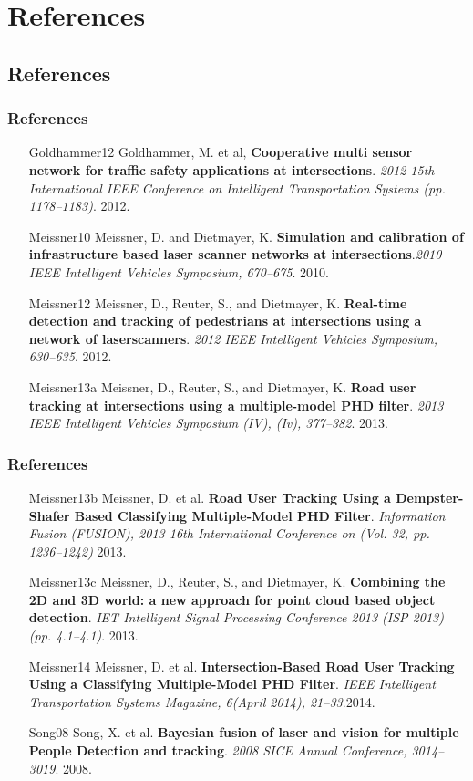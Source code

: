 \documentclass{beamer}
\begin{document}
\section{References}
\subsection{References}
\frame
{
	\frametitle{References}
	\footnotesize{	
	\begin{itemize}[leftmargin=.6in]
		\item [Goldhammer12] Goldhammer, M. et al, \textbf{Cooperative multi sensor network for traffic safety applications at intersections}. \textit{2012 15th International IEEE Conference on Intelligent Transportation Systems (pp. 1178–1183)}. 2012.
	    \item [Meissner10] Meissner, D. and Dietmayer, K. \textbf{Simulation and calibration of infrastructure based laser scanner networks at intersections}.\textit{2010 IEEE Intelligent Vehicles Symposium, 670–675}. 2010.
	    \item [Meissner12] Meissner, D., Reuter, S., and Dietmayer, K. \textbf{Real-time detection and tracking of pedestrians at intersections using a network of laserscanners}. \textit{2012 IEEE Intelligent Vehicles Symposium, 630–635}. 2012.
	    \item [Meissner13a] Meissner, D., Reuter, S., and Dietmayer, K. \textbf{Road user tracking at intersections using a multiple-model PHD filter}. \textit{2013 IEEE Intelligent Vehicles Symposium (IV), (Iv), 377–382}. 2013.
		
		
	\end{itemize}
	}
}

\frame
{
	\frametitle{References}
		\footnotesize{
	\begin{itemize}[leftmargin=.6in]
		\item [Meissner13b] Meissner, D. et al. \textbf{Road User Tracking Using a Dempster-Shafer Based Classifying Multiple-Model PHD Filter}. \textit{Information Fusion (FUSION), 2013 16th International Conference on (Vol. 32, pp. 1236–1242)} 2013.
		\item [Meissner13c] Meissner, D., Reuter, S., and Dietmayer, K. \textbf{Combining the 2D and 3D world: a new approach for point cloud based object detection}. \textit{IET Intelligent Signal Processing Conference 2013 (ISP 2013) (pp. 4.1–4.1)}. 2013.
		\item [Meissner14] Meissner, D. et al. \textbf{Intersection-Based Road User Tracking Using a Classifying Multiple-Model PHD Filter}.\textit{ IEEE Intelligent Transportation Systems Magazine, 6(April 2014), 21–33}.2014.
		\item [Song08] Song, X. et al. \textbf{Bayesian fusion of laser and vision for multiple People Detection and tracking}. \textit{2008 SICE Annual Conference, 3014–3019}. 2008.		
	\end{itemize}	
	}
}
\end{document}
